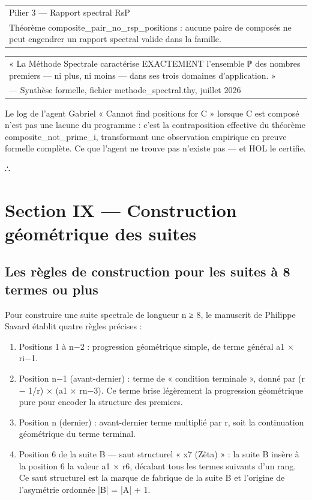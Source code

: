\documentclass[11pt,a4paper]{article}
\begin{document}
\begin{longtable}{|p{}|}
\hline
Pilier 3 — Rapport spectral RsP \\ Théorème composite\_pair\_no\_rsp\_positions : aucune paire de composés ne peut engendrer un rapport spectral valide dans la famille. \\
\hline
\end{longtable}



\begin{longtable}{|p{}|}
\hline
« La Méthode Spectrale caractérise EXACTEMENT l'ensemble ℙ des nombres premiers — ni plus, ni moins — dans ses trois domaines d'application. » \\ — Synthèse formelle, fichier methode\_spectral.thy, juillet 2026 \\
\hline
\end{longtable}


Le log de l'agent Gabriel « Cannot find positions for C » lorsque C est composé n'est pas une lacune du programme : c'est la contraposition effective du théorème composite\_not\_prime\_i, transformant une observation empirique en preuve formelle complète. Ce que l'agent ne trouve pas n'existe pas — et HOL le certifie.

∴

\section{Section IX — Construction géométrique des suites}
\subsection{Les règles de construction pour les suites à 8 termes ou plus}

Pour construire une suite spectrale de longueur n ≥ 8, le manuscrit de Philippe Savard établit quatre règles précises :

\begin{enumerate}[leftmargin=*]
\item Positions 1 à n−2 : progression géométrique simple, de terme général a1 × ri−1.
\item Position n−1 (avant-dernier) : terme de « condition terminale », donné par (r − 1/r) × (a1 × rn−3). Ce terme brise légèrement la progression géométrique pure pour encoder la structure des premiers.
\item Position n (dernier) : avant-dernier terme multiplié par r, soit la continuation géométrique du terme terminal.
\item Position 6 de la suite B — saut structurel « x7 (Zêta) » : la suite B insère à la position 6 la valeur a1 × r6, décalant tous les termes suivants d'un rang. Ce saut structurel est la marque de fabrique de la suite B et l'origine de l'asymétrie ordonnée |B| = |A| + 1.
\end{enumerate}
\end{document}
